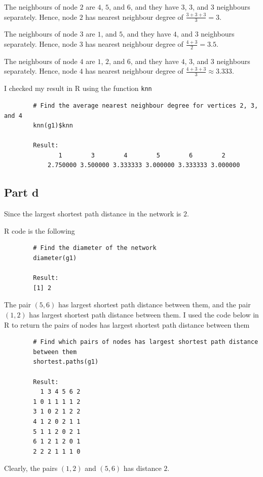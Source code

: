 \begin{answer}
    The neighbours of node $2$ are $4$, $5$, and $6$, and they have $3$, $3$, and $3$ neighbours separately. Hence, node $2$ has nearest neighbour degree of $\tfrac{3+3+3}{3} = 3$. 
    
    The neighbours of node $3$ are $1$, and $5$, and they have $4$, and $3$ neighbours separately. Hence, node $3$ has nearest neighbour degree of $\tfrac{4+3}{2} = 3.5$.
    
    The neighbours of node $4$ are $1$, $2$, and $6$, and they have $4$, $3$, and $3$ neighbours separately. Hence, node $4$ has nearest neighbour degree of $\tfrac{4+3+3}{3} \approx 3.333$.
    
    I checked my result in R using the function \verb+knn+
    \begin{verbatim}
        # Find the average nearest neighbour degree for vertices 2, 3, and 4
        knn(g1)$knn
        
        Result:
               1        3        4        5        6        2 
            2.750000 3.500000 3.333333 3.000000 3.333333 3.000000 
    \end{verbatim}
\end{answer}

\subsection{Part d}\label{sec:sec1d}

\begin{answer}
    Since the largest shortest path distance in the network is $2$. 
    
    R code is the following
    \begin{verbatim}
        # Find the diameter of the network
        diameter(g1)
        
        Result:
        [1] 2
    \end{verbatim}
    The pair $(5,6)$ has largest shortest path distance between them, and the pair $(1,2)$ has largest shortest path distance between them.
    I used the code below in R to return the pairs of nodes has largest shortest path distance between them 
    \begin{verbatim}
        # Find which pairs of nodes has largest shortest path distance 
        between them
        shortest.paths(g1)
        
        Result:
          1 3 4 5 6 2
        1 0 1 1 1 1 2
        3 1 0 2 1 2 2
        4 1 2 0 2 1 1
        5 1 1 2 0 2 1
        6 1 2 1 2 0 1
        2 2 2 1 1 1 0
    \end{verbatim}
    Clearly, the pairs $(1,2)$ and $(5,6)$ has distance $2$.
\end{answer}

